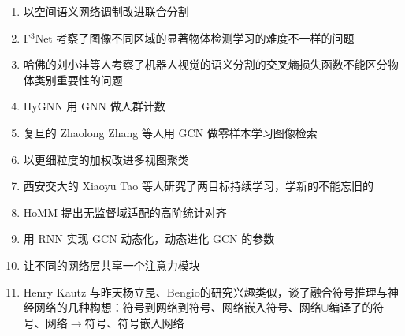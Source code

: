 \documentclass[11pt]{article}
\begin{document}
\begin{enumerate}
\begin{enumerate}
\item \cite{Zhang2019DeepOC} 以空间语义网络调制改进联合分割
\item F$^3$Net 考察了图像不同区域的显著物体检测学习的难度不一样的问题 \cite{Wei2019F3NetFF}
\item 哈佛的刘小沣等人考察了机器人视觉的语义分割的交叉熵损失函数不能区分物体类别重要性的问题
\item HyGNN \cite{Luo2020HybridGN} 用 GNN 做人群计数
\item 复旦的 Zhaolong Zhang 等人用 GCN 做零样本学习图像检索
\item \cite{chen2020multi} 以更细粒度的加权改进多视图聚类
\item 西安交大的 Xiaoyu Tao 等人研究了两目标持续学习，学新的不能忘旧的
\item HoMM \cite{chen2019homm} 提出无监督域适配的高阶统计对齐
\item \cite{DBLP:journals/corr/abs-1902-10191} 用 RNN 实现 GCN 动态化，动态进化 GCN 的参数
\item \cite{DBLP:journals/corr/abs-1905-10671} 让不同的网络层共享一个注意力模块
\item Henry Kautz 与昨天杨立昆、Bengio的研究兴趣类似，谈了融合符号推理与神经网络的几种构想：符号到网络到符号、网络嵌入符号、网络$\cup$编译了的符号、网络$\to$符号、符号嵌入网络
\end{enumerate}


\end{enumerate}
\end{document}
